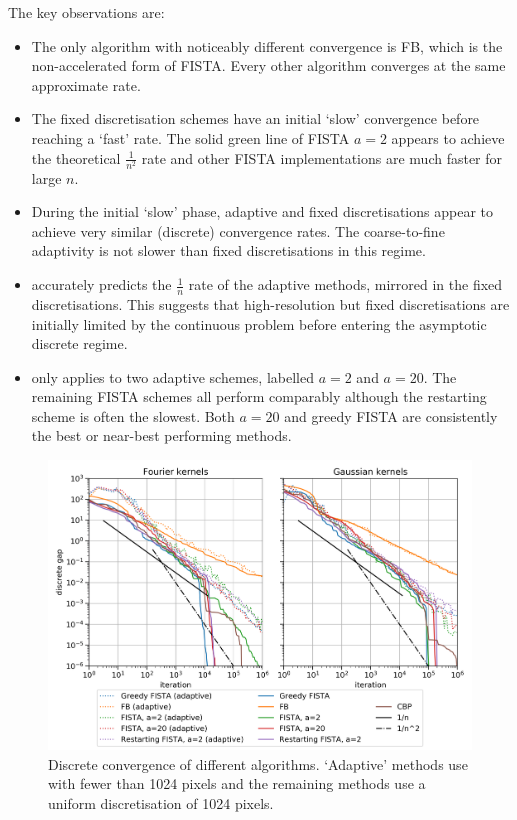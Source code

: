 \documentclass[10pt,a4paper,onecolumn]{article} \usepackage[latin1]{inputenc}
\numberwithin{equation}{section}
\begin{document}
\pagebreak The key observations are:
\begin{itemize}
	\item The only algorithm with noticeably different convergence is FB, which is the non-accelerated form of FISTA. Every other algorithm converges at the same approximate rate.
	\item The fixed discretisation schemes have an initial `slow' convergence before reaching a `fast' rate. The solid green line of FISTA $a=2$ appears to achieve the theoretical $\frac1{n^2}$ rate and other FISTA implementations are much faster for large $n$.
	\item During the initial `slow' phase, adaptive and fixed discretisations appear to achieve very similar (discrete) convergence rates. The coarse-to-fine adaptivity is not slower than fixed discretisations in this regime.
	\item {} accurately predicts the $\frac1n$ rate of the adaptive methods, mirrored in the fixed discretisations. This suggests that high-resolution but fixed discretisations are initially limited by the continuous problem before entering the asymptotic discrete regime.
	\item {} only applies to two adaptive schemes, labelled $a=2$ and $a=20$. The remaining FISTA schemes all perform comparably although the restarting scheme is often the slowest. Both $a=20$ and greedy FISTA are consistently the best or near-best performing methods.
\end{itemize}

\begin{figure}[H]\centering
	\includegraphics[width=.84\textwidth]{lasso_convergence}
	\caption{Discrete convergence of different algorithms. `Adaptive' methods use  with fewer than 1024 pixels and the remaining methods use a uniform discretisation of 1024 pixels.}\label{fig:ca: convergence with method}
\end{figure}
\end{document}
